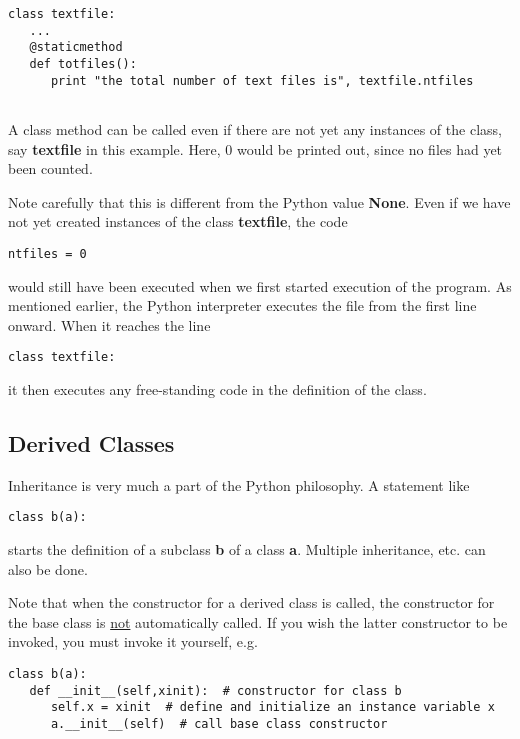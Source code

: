 \begin{Verbatim}[fontsize=\relsize{-2}]
class textfile:
   ...
   @staticmethod
   def totfiles():
      print "the total number of text files is", textfile.ntfiles
 
\end{Verbatim}

A class method can be called even if there are not yet any instances of
the class, say {\bf textfile} in this example.  Here, 0 would be printed
out, since no files had yet been counted.

Note carefully that this is different from the Python value {\bf None}.
Even if we have not yet created instances of the class {\bf textfile},
the code

\begin{Verbatim}[fontsize=\relsize{-2}]
ntfiles = 0  
\end{Verbatim}

would still have been executed when we first started execution of the
program.  As mentioned earlier, the Python interpreter executes
the file from the first line onward.  When it reaches the line 

\begin{Verbatim}[fontsize=\relsize{-2}]
class textfile:
\end{Verbatim}

it then executes any free-standing code in the definition of the class.

\subsection{Derived Classes}

Inheritance is very much a part of the Python philosophy.  A statement
like

\begin{Verbatim}[fontsize=\relsize{-2}]
class b(a):
\end{Verbatim}

starts the definition of a subclass {\bf b} of a class {\bf a}.
Multiple inheritance, etc. can also be done.

Note that when the constructor for a derived class is called, the
constructor for the base class is \underline{not} automatically called.
If you wish the latter constructor to be invoked, you must invoke it
yourself, e.g.

\begin{Verbatim}[fontsize=\relsize{-2}]
class b(a):
   def __init__(self,xinit):  # constructor for class b
      self.x = xinit  # define and initialize an instance variable x
      a.__init__(self)  # call base class constructor
\end{Verbatim}

